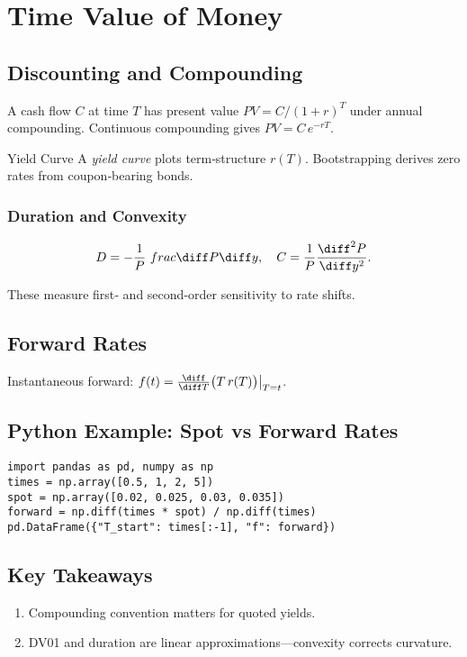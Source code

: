 \chapter{Time Value of Money}\label{ch:timevalue}

\section{Discounting and Compounding}

A cash flow \(C\) at time \(T\) has present value
\(PV = C/(1+r)^T\) under annual compounding.
Continuous compounding gives \(PV = C\,e^{-rT}\).

\begin{definition}{Yield Curve}{}
A \emph{yield curve} plots term‑structure \(r(T)\).
Bootstrapping derives zero rates from coupon‑bearing bonds.
\end{definition}

\subsection{Duration and Convexity}
\[
D = -\frac{1}{P}\
frac{\diff P}{\diff y},\quad
C = \frac{1}{P}\frac{\diff^2 P}{\diff y^2}.
\]

These measure first‑ and second‑order sensitivity to rate shifts.

\section{Forward Rates}
Instantaneous forward:
\(f(t) = \frac{\diff}{\diff T}\bigl(T \, r(T)\bigr)\big|_{T=t}\).

\section*{Python Example: Spot vs Forward Rates}
\begin{verbatim}
import pandas as pd, numpy as np
times = np.array([0.5, 1, 2, 5])
spot = np.array([0.02, 0.025, 0.03, 0.035])
forward = np.diff(times * spot) / np.diff(times)
pd.DataFrame({"T_start": times[:-1], "f": forward})
\end{verbatim}

\section*{Key Takeaways}
\begin{enumerate}
  \item Compounding convention matters for quoted yields.
  \item DV01 and duration are linear approximations—convexity corrects curvature.
\end{enumerate}
